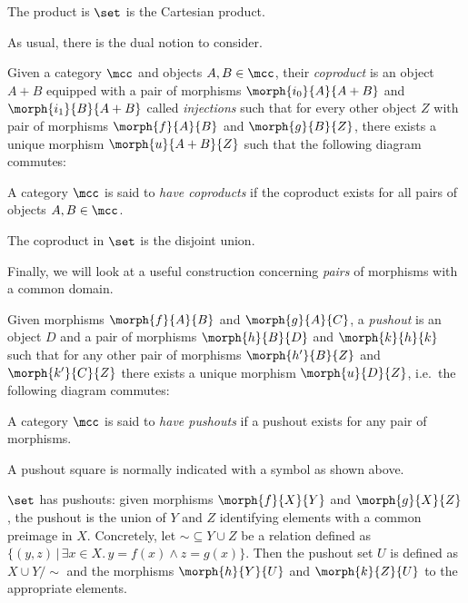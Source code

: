 \begin{example}
    The product is \(\set\) is the Cartesian product.
\end{example}

As usual, there is the dual notion to consider.

\begin{definition}[Coproduct]
    Given a category \(\mcc\) and objects \(A,B \in \mcc\), their \emph{coproduct}
    is an object \(A + B\) equipped with a pair of morphisms
    \(\morph{i_0}{A}{A + B}\) and \(\morph{i_1}{B}{A + B}\) called
    \emph{injections} such that for every other object \(Z\) with pair of
    morphisms \(\morph{f}{A}{B}\) and \(\morph{g}{B}{Z}\), there exists a unique
    morphism \(\morph{u}{A + B}{Z}\) such that the following diagram
    commutes:
    \begin{center}
        
    \end{center}
    A category \(\mcc\) is said to \emph{have coproducts} if the coproduct
    exists for all pairs of objects \(A,B \in \mcc\).
\end{definition}

\begin{example}
    The coproduct in \(\set\) is the disjoint union.
\end{example}

Finally, we will look at a useful construction concerning \emph{pairs} of
morphisms with a common domain.

\begin{definition}[Pushout]
    Given morphisms \(\morph{f}{A}{B}\) and \(\morph{g}{A}{C}\), a
    \emph{pushout} is an object \(D\) and a pair of morphisms
    \(\morph{h}{B}{D}\) and \(\morph{k}{h}{k}\) such that for any other pair of
    morphisms \(\morph{h^\prime}{B}{Z}\) and \(\morph{k^\prime}{C}{Z}\) there
    exists a unique morphism \(\morph{u}{D}{Z}\), i.e.\ the following diagram
    commutes:
    \begin{center}
        
    \end{center}
    A category \(\mcc\) is said to \emph{have pushouts} if a pushout exists for
    any pair of morphisms.
\end{definition}

A pushout square is normally indicated with a \raisebox{-0.25em}{\(\ulcorner\)}
symbol as shown above.

\begin{example}
    \(\set\) has pushouts: given morphisms \(\morph{f}{X}{Y}\) and
    \(\morph{g}{X}{Z}\), the pushout is the union of \(Y\) and \(Z\) identifying
    elements with a common preimage in \(X\).
    Concretely, let \({\sim} \subseteq Y \cup Z\) be a relation defined as
    \(\{(y, z) \,|\, \exists x \in X.\, y = f(x) \wedge z = g(x)\}\).
    Then the pushout set \(U\) is defined as \(X \cup Y / \sim\) and the
    morphisms \(\morph{h}{Y}{U}\) and \(\morph{k}{Z}{U}\) to the appropriate
    elements.
\end{example}

